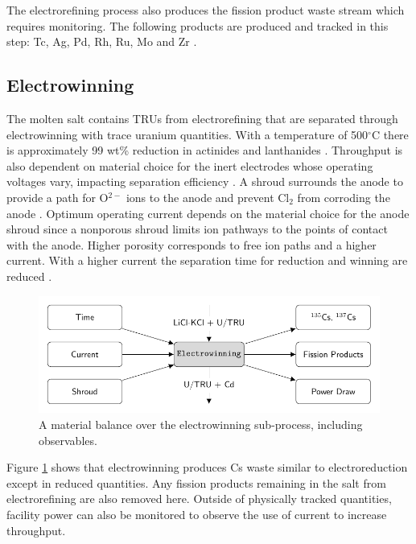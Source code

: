 \documentclass{anstrans}
\begin{document}
The electrorefining process also produces the fission product waste stream which requires monitoring. The following products are produced 
and tracked in this step: Tc, Ag, Pd, Rh, Ru, Mo and Zr \cite{flowsheet_1998}.

\subsection{Electrowinning}

The molten salt contains TRUs from electrorefining that are separated through electrowinning with trace uranium quantities. 
With a temperature of 500$^{\circ}$C there is approximately 99 wt\% reduction in actinides and lanthanides \cite{flowsheet_1998}. 
Throughput is also dependent on material choice for the inert electrodes whose operating voltages vary, impacting separation 
efficiency \cite{koyama_development_2012}. A shroud surrounds the anode to provide a path for O$^{2-}$ ions to the anode and 
prevent Cl$_2$ from corroding the anode \cite{kim_development_2013,choi_electrochemical_2015}. Optimum operating current 
depends on the material choice for the anode shroud since a nonporous shroud limits ion pathways to the points of contact 
with the anode. Higher porosity corresponds to free ion paths and a higher current. With a higher current the separation 
time for reduction and winning are reduced \cite{choi_electrochemical_2015}.

\begin{figure}[ht]
	\centering
	\includegraphics[width=1\linewidth]{winning}
	\caption{A material balance over the electrowinning sub-process, including observables.}
	\label{fig:winning}
\end{figure}

Figure \ref{fig:winning} shows that electrowinning produces Cs waste similar to electroreduction except in reduced quantities. Any fission products remaining in the salt from electrorefining are also removed here. Outside of physically tracked quantities, facility power can also be monitored to observe the use of current to increase throughput. 
\end{document}
